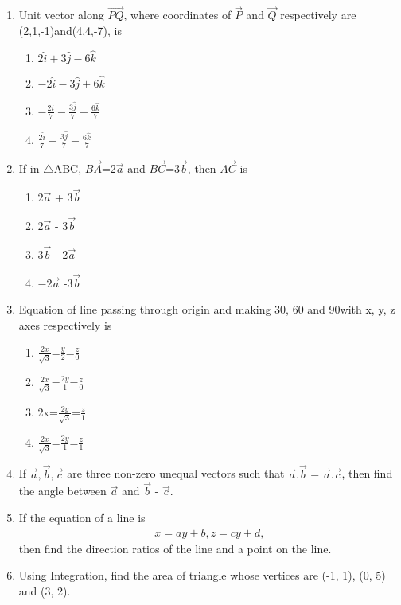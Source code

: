 \begin{enumerate}


\item Unit vector along $\vec{PQ}$, where coordinates of $\vec{P}$ and $\vec{Q}$ respectively are (2,1,-1)and(4,4,-7), is
\begin{enumerate}
\item $2\hat{i}+3\hat{j}-6\hat{k}$
\item $-2\hat{i}-3\hat{j}+6\hat{k}$
\item $-\frac{2\hat{i}}{7}-\frac{3\hat{j}}{7}+\frac{6\hat{k}}{7}$
\item $\frac{2\hat{i}}{7}+\frac{3\hat{j}}{7}-\frac{6\hat{k}}{7}$
\end{enumerate}

\item If in $\triangle$ABC, $\overrightarrow{BA}$=2$\overrightarrow{a}$ and $\overrightarrow{BC}$=3$\overrightarrow{b}$, then $\overrightarrow{AC}$ is
\begin{enumerate}
\item $2\overrightarrow{a}$ + 3$\overrightarrow{b}$
\item $2\overrightarrow{a}$ - 3$\overrightarrow{b}$
\item $3\overrightarrow{b}$ - 2$\overrightarrow{a}$
\item $-2\overrightarrow{a}$ -3$\overrightarrow{b}$
\end{enumerate}

\item Equation of line passing through origin and making 30\degree{}, 60\degree{} and 90\degree with x, y, z axes respectively is
\begin{enumerate}
\item $\frac{2x}{\sqrt{3}}$=$\frac{y}{2}$=$\frac{z}{0}$
\item $\frac{2x}{\sqrt{3}}$=$\frac{2y}{1}$=$\frac{z}{0}$
\item 2x=$\frac{2y}{\sqrt{3}}$=$\frac{z}{1}$
\item $\frac{2x}{\sqrt{3}}$=$\frac{2y}{1}$=$\frac{z}{1}$
\end{enumerate}

\item If $\overrightarrow{a}, \overrightarrow{b}, \overrightarrow{c}$ are three non-zero unequal vectors such that $\overrightarrow{a}.\overrightarrow{b}$ = $\overrightarrow{a}.\overrightarrow{c}$, then find the angle between $\overrightarrow{a}$ and $\overrightarrow{b}$ - $\overrightarrow{c}$.


\item If the equation of a line is
       \begin{align}
	x = ay + b, z = cy +d,
       \end{align}  then find the direction ratios of the line and a point on the line.

\item Using Integration, find the area of triangle whose vertices are (-1, 1), (0, 5) and (3, 2).


\end{enumerate}

